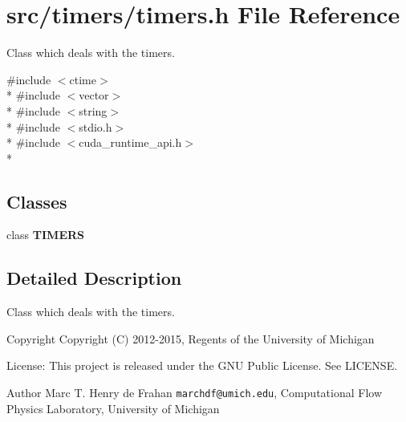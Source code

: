 \section{src/timers/timers.h File Reference}
\label{timers_8h}


Class which deals with the timers.  


{\ttfamily \#include $<$ctime$>$}\\*
{\ttfamily \#include $<$vector$>$}\\*
{\ttfamily \#include $<$string$>$}\\*
{\ttfamily \#include $<$stdio.\-h$>$}\\*
{\ttfamily \#include $<$cuda\-\_\-runtime\-\_\-api.\-h$>$}\\*
\subsection*{Classes}
\begin{DoxyCompactItemize}
\item 
class {\bf T\-I\-M\-E\-R\-S}
\end{DoxyCompactItemize}


\subsection{Detailed Description}
Class which deals with the timers. \begin{DoxyCopyright}{Copyright}
Copyright (C) 2012-\/2015, Regents of the University of Michigan 
\end{DoxyCopyright}
\begin{DoxyParagraph}{License\-:}
This project is released under the G\-N\-U Public License. See L\-I\-C\-E\-N\-S\-E. 
\end{DoxyParagraph}
\begin{DoxyAuthor}{Author}
Marc T. Henry de Frahan {\tt marchdf@umich.\-edu}, Computational Flow Physics Laboratory, University of Michigan 
\end{DoxyAuthor}
